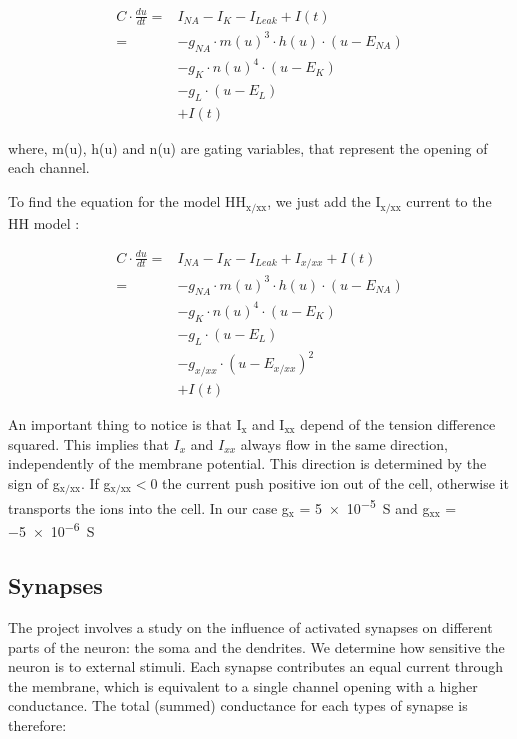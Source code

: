 \documentclass[a4paper, 10pt, conference]{ieeeconf}      %
\begin{document}
\begin{equation}
\begin{split}
C \cdot \frac{du}{dt} =& I_{NA} - I_K - I_{Leak} + I(t) \\
= &-g_{NA} \cdot m(u)^3 \cdot h(u) \cdot (u-E_{NA}) \\
&-g_K \cdot n(u)^4 \cdot (u-E_K) \\
&-g_L \cdot (u-E_L) \\
&+I(t)
\end{split}
\end{equation}

where, m(u), h(u) and n(u) are gating variables, that represent the opening of each channel. 

To find the equation for the model HH$_\text{x/xx}$, we just add the I$_\text{x/xx}$ current to the HH model : 

\begin{equation}
\begin{split}
C \cdot \frac{du}{dt} =& I_{NA} - I_K - I_{Leak} + I_{x/xx} + I(t) \\ 
= &-g_{NA} \cdot m(u)^3 \cdot h(u) \cdot (u-E_{NA}) \\
&-g_K \cdot n(u)^4 \cdot (u-E_K) \\
&-g_L \cdot (u-E_L) \\
& - g_{x/xx} \cdot (u-E_{x/xx})^2 \\
& +I(t)
\end{split}
\end{equation}

An important thing to notice is that I$_\text{x}$ and I$_\text{xx}$ depend of the tension difference squared. This implies that $I_{x}$ and $I_{xx}$ always flow in the same direction, independently of the membrane potential. This direction is determined by the sign of g$_\text{x/xx}$. If g$_\text{x/xx}<0$ the current push positive ion out of the cell, otherwise it transports the ions into the cell. In our case g$_\text{x}$ = \SI{5e-5}{\siemens} and g$_\text{xx}$ = \SI{-5e-6}{\siemens} 





\subsection{Synapses}
The project involves a study on the influence of activated synapses on different parts of the neuron: the soma and the dendrites. We determine how sensitive the neuron is to external stimuli. Each synapse contributes an equal current through the membrane, which is equivalent to a single channel opening with a higher conductance. The total (summed) conductance for each types of synapse is therefore:
\end{document}
